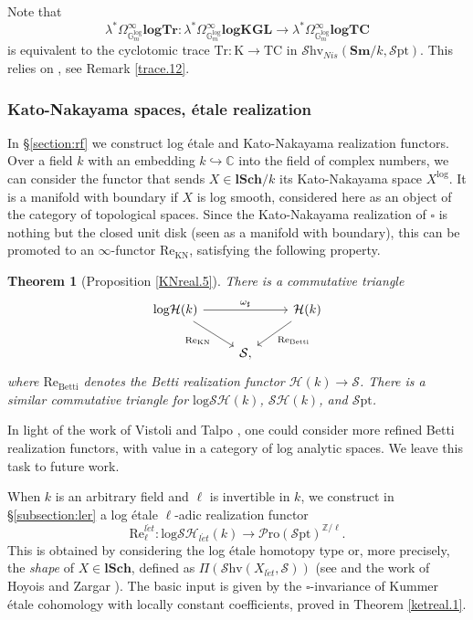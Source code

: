 \documentclass[11pt, a4paper]{amsart}
\newtheorem{thm}{Theorem}[subsection]
\theoremstyle{definition}
\numberwithin{equation}{subsection}
\newcommand{\Z}{\mathbb{Z}}
\newcommand{\lSch}{\mathbf{lSch}}
\newcommand{\Sm}{\mathbf{Sm}}
\newcommand{\TC}{\mathrm{TC}}
\newcommand{\Tr}{\mathrm{Tr}}
\newcommand{\Kth}{\mathrm{K}}
\newcommand{\Betti}{\mathrm{Betti}}
\newcommand{\et}{{\acute{e}t}}
\newcommand{\Real}{\mathrm{Re}}
\newcommand{\logKGL}{\mathbf{logKGL}}
\newcommand{\spectlogTr}{\mathbf{logTr}}
\newcommand{\spectlogTC}{\mathbf{logTC}}
\newcommand{\boxx}{\square}
\newcommand{\Gmm}{\mathbb{G}_m^{\mathrm{log}}}
\newcommand{\infSpc}{\mathcal{S}}
\newcommand{\infShv}{\mathcal{S}\mathrm{hv}}
\newcommand{\infSpt}{\mathcal{S}\mathrm{pt}}
\newcommand{\infSH}{\mathcal{SH}}
\newcommand{\infH}{\mathcal{H}}
\newcommand{\inflogH}{\mathrm{log}\mathcal{H}}
\newcommand{\inflogSH}{\mathrm{log}\mathcal{SH}}
\begin{document}
Note that 
\[
\lambda^*\Omega_{\Gmm}^\infty \spectlogTr\colon \lambda^*\Omega_{\Gmm}^\infty \logKGL \to \lambda^*\Omega_{\Gmm}^\infty \spectlogTC
\]
is equivalent to the cyclotomic trace $\Tr\colon \Kth\to \TC$ in $\infShv_{Nis}(\Sm/k,\infSpt)$.
 This relies on \cite{logSHF1}, see Remark \ref{trace.12}.

\subsubsection{Kato-Nakayama spaces, \'etale realization}In \S\ref{section:rf} we construct log \'etale and Kato-Nakayama realization functors. 
Over a  field $k$ with an embedding  $k\hookrightarrow \mathbb{C}$ into the field of complex numbers, we can consider the functor that sends $X\in \lSch/k$ its Kato-Nakayama space $X^{\log}$. It is a manifold with boundary if $X$ is log smooth, considered here as an object of the category of topological spaces. Since the Kato-Nakayama realization of $\boxx$ is nothing but the closed unit disk (seen as a manifold with boundary), this can be promoted to  an $\infty$-functor
$\mathrm{Re}_{\mathrm{KN}}$, satisfying the following property.
\begin{thm}[Proposition \ref{KNreal.5}]
There is a commutative triangle
\[
\begin{tikzcd}
\inflogH(k)\ar[rr,"\omega_\sharp"]\ar[rd,"\Real_{\mathrm{KN}}"']&
&
\infH(k)\ar[ld,"\Real_\Betti"]
\\
&
\infSpc,
\end{tikzcd}\]
where $\Real_{\Betti}$ denotes the Betti realization functor 
$\infH(k)\to \infSpc$.
There is a similar commutative triangle for $\inflogSH(k)$, $\infSH(k)$, and $\infSpt$.
\end{thm}
In light of the work of Vistoli and Talpo \cite{MR3869583}, one could consider more refined Betti realization functors, with value in a category of log analytic spaces. We leave this task to future work. 

When $k$ is an arbitrary field and $\ell$ is invertible in $k$, we construct in \S \ref{subsection:ler} a log \'etale $\ell$-adic realization functor
\[
\mathrm{Re}^{l\et}_\ell\colon \inflogSH_{l\et}(k) \to \mathcal{P}\mathrm{ro}(\infSpt)^{\Z/\ell}.
\]
This is obtained by considering the log \'etale homotopy type or, more precisely, the \emph{shape} of $X\in \lSch$, defined as $\Pi(\infShv(X_{l\et}, \infSpc))$ (see \cite[Chapter 7]{HTT} and the work of Hoyois \cite{Hoyoisetalesymmetric} and Zargar \cite{zbMATH07103864}). The basic input is given by the $\boxx$-invariance of Kummer \'etale cohomology with locally constant coefficients, proved in Theorem \ref{ketreal.1}. 
\
\end{document}
